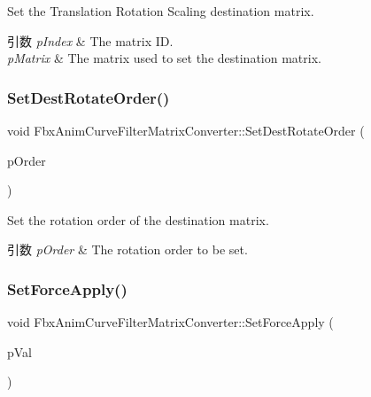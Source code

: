 Set the Translation Rotation Scaling destination matrix. 
\begin{DoxyParams}{引数}
{\em p\+Index} & The matrix ID. \\
\hline
{\em p\+Matrix} & The matrix used to set the destination matrix. \\
\hline
\end{DoxyParams}
\mbox{\label{class_fbx_anim_curve_filter_matrix_converter_a115f94c96f1f14b55e4f3f9b6bc5977a}} 
\subsubsection{\texorpdfstring{Set\+Dest\+Rotate\+Order()}{SetDestRotateOrder()}}
{\footnotesize\ttfamily void Fbx\+Anim\+Curve\+Filter\+Matrix\+Converter\+::\+Set\+Dest\+Rotate\+Order (\begin{DoxyParamCaption}\item[{\hyperlink{class_fbx_euler_a7d5bec7eedb022b4dae56894ab7a9939}{Fbx\+Euler\+::\+E\+Order}}]{p\+Order }\end{DoxyParamCaption})}

Set the rotation order of the destination matrix. 
\begin{DoxyParams}{引数}
{\em p\+Order} & The rotation order to be set. \\
\hline
\end{DoxyParams}
\mbox{\label{class_fbx_anim_curve_filter_matrix_converter_a4b49dc7704c847a3b909cf7d9052f7a7}} 
\subsubsection{\texorpdfstring{Set\+Force\+Apply()}{SetForceApply()}}
{\footnotesize\ttfamily void Fbx\+Anim\+Curve\+Filter\+Matrix\+Converter\+::\+Set\+Force\+Apply (\begin{DoxyParamCaption}\item[{bool}]{p\+Val }\end{DoxyParamCaption})}

